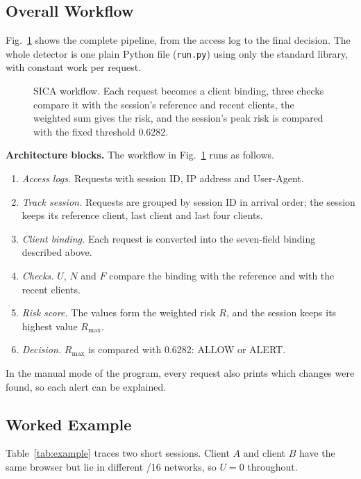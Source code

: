 \documentclass[conference]{IEEEtran}
\begin{document}
\subsection{Overall Workflow}

Fig.~\ref{fig:arch} shows the complete pipeline, from the access log to the
final decision. The whole detector is one plain Python file (\texttt{run.py})
using only the standard library, with constant work per request.

\begin{figure}[t]
\centering

\caption{SICA workflow. Each request becomes a client binding, three checks
compare it with the session's reference and recent clients, the weighted sum
gives the risk, and the session's peak risk is compared with the fixed
threshold 0.6282.}
\label{fig:arch}
\end{figure}

\textbf{Architecture blocks.} The workflow in Fig.~\ref{fig:arch} runs as follows.
\begin{enumerate}
\item \emph{Access logs.} Requests with session ID, IP address and User-Agent.
\item \emph{Track session.} Requests are grouped by session ID in arrival order;
the session keeps its reference client, last client and last four clients.
\item \emph{Client binding.} Each request is converted into the seven-field
binding described above.
\item \emph{Checks.} $U$, $N$ and $F$ compare the binding with the reference and
with the recent clients.
\item \emph{Risk score.} The values form the weighted risk $R$, and the session
keeps its highest value $R_{\max}$.
\item \emph{Decision.} $R_{\max}$ is compared with 0.6282: ALLOW or ALERT.
\end{enumerate}
In the manual mode of the program, every request also prints which changes
were found, so each alert can be explained.

\subsection{Worked Example}

Table~\ref{tab:example} traces two short sessions. Client $A$ and client $B$
have the same browser but lie in different /16 networks, so $U=0$ throughout.
\end{document}
